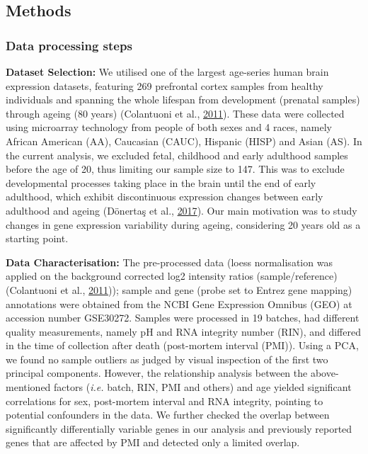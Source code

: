 \documentclass[12pt,twoside]{unicam}
\begin{document}
\hypertarget{veronikaMethods}{%
\subsection{Methods}\label{veronikaMethods}}

\hypertarget{data-processing-steps}{%
\subsubsection{Data processing steps}\label{data-processing-steps}}

\textbf{Dataset Selection:} We utilised one of the largest age-series human brain expression datasets, featuring 269 prefrontal cortex samples from healthy individuals and spanning the whole lifespan from development (prenatal samples) through ageing (80 years) (Colantuoni et al., \protect\hyperlink{ref-Colantuoni2011}{2011}). These data were collected using microarray technology from people of both sexes and 4 races, namely African American (AA), Caucasian (CAUC), Hispanic (HISP) and Asian (AS). In the current analysis, we excluded fetal, childhood and early adulthood samples before the age of 20, thus limiting our sample size to 147. This was to exclude developmental processes taking place in the brain until the end of early adulthood, which exhibit discontinuous expression changes between early adulthood and ageing (Dönertaş et al., \protect\hyperlink{ref-Donertas2017}{2017}). Our main motivation was to study changes in gene expression variability during ageing, considering 20 years old as a starting point.

\textbf{Data Characterisation:} The pre-processed data (loess normalisation was applied on the background corrected log2 intensity ratios (sample/reference)(Colantuoni et al., \protect\hyperlink{ref-Colantuoni2011}{2011})); sample and gene (probe set to Entrez gene mapping) annotations were obtained from the NCBI Gene Expression Omnibus (GEO) at accession number GSE30272. Samples were processed in 19 batches, had different quality measurements, namely pH and RNA integrity number (RIN), and differed in the time of collection after death (post-mortem interval (PMI)). Using a PCA, we found no sample outliers as judged by visual inspection of the first two principal components. However, the relationship analysis between the above-mentioned factors (\emph{i.e.} batch, RIN, PMI and others) and age yielded significant correlations for sex, post-mortem interval and RNA integrity, pointing to potential confounders in the data. We further checked the overlap between significantly differentially variable genes in our analysis and previously reported genes that are affected by PMI and detected only a limited overlap.
\end{document}
